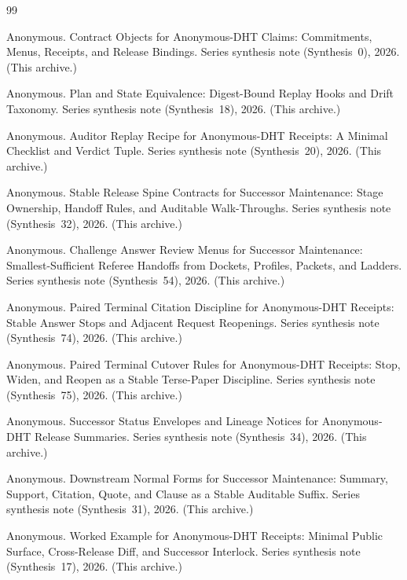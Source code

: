 \documentclass[11pt]{article}
\begin{document}
\begin{thebibliography}{99}\small

Anonymous.
\newblock Contract Objects for Anonymous-DHT Claims: Commitments, Menus, Receipts, and Release Bindings.
\newblock Series synthesis note (Synthesis~0), 2026. (This archive.)

Anonymous.
\newblock Plan and State Equivalence: Digest-Bound Replay Hooks and Drift Taxonomy.
\newblock Series synthesis note (Synthesis~18), 2026. (This archive.)

Anonymous.
\newblock Auditor Replay Recipe for Anonymous-DHT Receipts: A Minimal Checklist and Verdict Tuple.
\newblock Series synthesis note (Synthesis~20), 2026. (This archive.)

Anonymous.
\newblock Stable Release Spine Contracts for Successor Maintenance: Stage Ownership, Handoff Rules, and Auditable Walk-Throughs.
\newblock Series synthesis note (Synthesis~32), 2026. (This archive.)

Anonymous.
\newblock Challenge Answer Review Menus for Successor Maintenance: Smallest-Sufficient Referee Handoffs from Dockets, Profiles, Packets, and Ladders.
\newblock Series synthesis note (Synthesis~54), 2026. (This archive.)

Anonymous.
\newblock Paired Terminal Citation Discipline for Anonymous-DHT Receipts: Stable Answer Stops and Adjacent Request Reopenings.
\newblock Series synthesis note (Synthesis~74), 2026. (This archive.)

Anonymous.
\newblock Paired Terminal Cutover Rules for Anonymous-DHT Receipts: Stop, Widen, and Reopen as a Stable Terse-Paper Discipline.
\newblock Series synthesis note (Synthesis~75), 2026. (This archive.)

Anonymous.
\newblock Successor Status Envelopes and Lineage Notices for Anonymous-DHT Release Summaries.
\newblock Series synthesis note (Synthesis~34), 2026. (This archive.)

Anonymous.
\newblock Downstream Normal Forms for Successor Maintenance: Summary, Support, Citation, Quote, and Clause as a Stable Auditable Suffix.
\newblock Series synthesis note (Synthesis~31), 2026. (This archive.)

Anonymous.
\newblock Worked Example for Anonymous-DHT Receipts: Minimal Public Surface, Cross-Release Diff, and Successor Interlock.
\newblock Series synthesis note (Synthesis~17), 2026. (This archive.)

\end{thebibliography}
\end{document}
